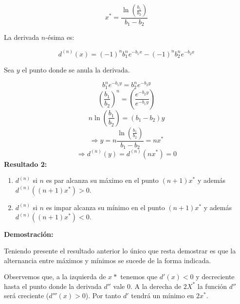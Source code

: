 \documentclass[11pt,a4paper]{article}
\begin{document}
\begin{equation*}
    x^* = \frac{\ln  \left( {\frac{ b_1}{b_2}} \right) }{b_1 - b_2}
\end{equation*}

La derivada $n$-ésima es:

\begin{equation}
    d^{(n)} (x) = (-1)^{n} b_{1}^{n} e^{-b_1 x} - (-1)^{n} b_{2}^{n} e^{-b_2 x}
\end{equation}

Sea $y$ el punto donde se anula la derivada.

\begin{equation*}
    b_{1}^{n} e^{-b_1 y} = b_{2}^{n} e^{-b_2 y}
\end{equation*}
\begin{equation*}
    \left( \frac{b_1}{b_2} \right)^{n} = \left( \frac{e^{-b_2 y}}{e^{-b_1 y}} \right)
\end{equation*}
\begin{equation*}
    n \ln{\left( \frac{b_1}{b_2} \right)} = (b_1 - b_2) y
\end{equation*}
\begin{equation*}
    \Rightarrow y = n \frac{ \ln{\left( \frac{b_1}{b_2} \right)}}{b_1 - b_2} = n x^{*}
\end{equation*}
\begin{equation}
    \Rightarrow d^{(n)} (y) = d^{(n)} (nx^{*}) = 0
\end{equation}
\blacksquare
\newpage
\noindent\textbf{Resultado 2:} 
\begin{enumerate}
    \item $d^{(n)}$ si $n$ es par alcanza su máximo en el punto $(n+1)x^{*}$ y además $d^{(n)} ((n+1)x^{*}) > 0$. 
    \item $d^{(n)}$ si $n$ es impar alcanza su mínimo en el punto $(n+1)x^{*}$ y además $d^{(n)} ((n+1)x^{*}) < 0$.
\end{enumerate}

\noindent\textbf{Demostración:}

Teniendo presente el resultado anterior lo único que resta demostrar es que la alternancia entre máximos y mínimos se sucede de la forma indicada.

Observemos que, a la izquierda de $x^{}*$ tenemos que $d'(x) < 0$ y decreciente hasta el punto donde la derivada $d''$ vale $0$. A la derecha de $2X^{*}$ la función $d''$ será creciente ($d''' (x) > 0$). Por tanto $d'$ tendrá un mínimo en $2x^{*}$.
\end{document}
